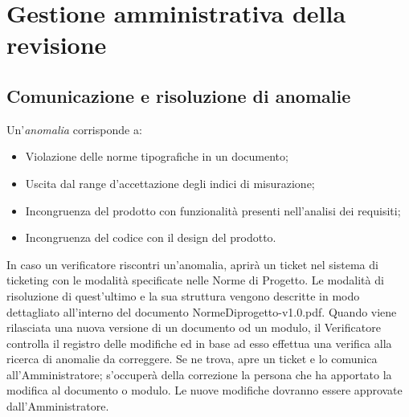 \section{Gestione amministrativa della revisione}


\subsection{Comunicazione e risoluzione di anomalie}

Un'\textit{anomalia} corrisponde a:
\begin{itemize}
	\item Violazione delle norme tipografiche in un documento;
	\item Uscita dal range d'accettazione degli indici di misurazione;
	\item Incongruenza del prodotto con funzionalità presenti nell'analisi dei requisiti;
	\item Incongruenza del codice con il design del prodotto.
\end{itemize}

In caso un verificatore riscontri un'anomalia, aprirà un ticket nel sistema di ticketing con le modalità specificate nelle Norme di Progetto.
Le modalità di risoluzione di quest'ultimo e la sua struttura vengono descritte in modo dettagliato all'interno del documento NormeDiprogetto-v1.0.pdf.
Quando viene rilasciata una nuova versione di un documento od un modulo, il Verificatore controlla il registro delle modifiche ed in base ad esso effettua una verifica alla ricerca di anomalie da correggere. Se ne trova, apre un ticket e lo comunica all'Amministratore; s'occuperà della correzione la persona che ha apportato la modifica al documento o modulo. Le nuove modifiche dovranno essere approvate dall'Amministratore.